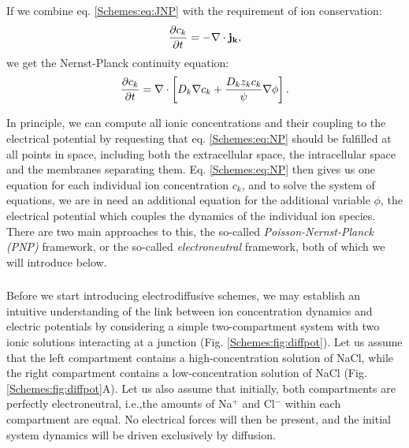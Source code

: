 If we combine eq. \ref{Schemes:eq:JNP} with the requirement of ion conservation:
\begin{equation}
\frac{\partial c_k}{\partial t} = -\nabla \cdot {\bf j_k},
\label{Schemes:eq:general_ionconservation}
\end{equation}
we get the Nernst-Planck continuity equation:
\begin{equation}
\frac{\partial c_k}{\partial t} = {\bf \nabla} \cdot \left[{D_k} {\bf \nabla} c_k + \frac{D_k z_k c_k}{\psi}{\bf \nabla} \phi \right].
\label{Schemes:eq:NP}
\end{equation}

In principle, we can compute all ionic concentrations and their coupling to the electrical potential by requesting that eq. \ref{Schemes:eq:NP} should be fulfilled at all points in space, including both the extracellular space, the intracellular space and the membranes separating them. Eq. \ref{Schemes:eq:NP} then gives us one equation for each individual ion concentration $c_k$, and to solve the system of equations, we are in need an additional equation for the additional variable $\phi$, the electrical potential which couples the dynamics of the individual ion species. There are two main approaches to this, the so-called \textit{Poisson-Nernst-Planck (PNP)} framework, or the so-called \textit{electroneutral} framework, both of which we will introduce below. 


\subsubsection{}
\label{sec:Schemes:LJpot}
Before we start introducing electrodiffusive schemes, we may establish an intuitive understanding of the link between ion concentration dynamics and electric potentials by considering a simple two-compartment system with two ionic solutions interacting at a junction  (Fig. \ref{Schemes:fig:diffpot}). Let us assume that the left compartment contains a high-concentration solution of NaCl, while the right compartment contains a low-concentration solution of NaCl (Fig. \ref{Schemes:fig:diffpot}A). Let us also assume that initially, both compartments are perfectly electroneutral, i.e.,the amounts of Na$^+$ and Cl$^-$ within each compartment are equal. No  electrical forces will then be present, and the initial system dynamics will be driven exclusively by diffusion. 

